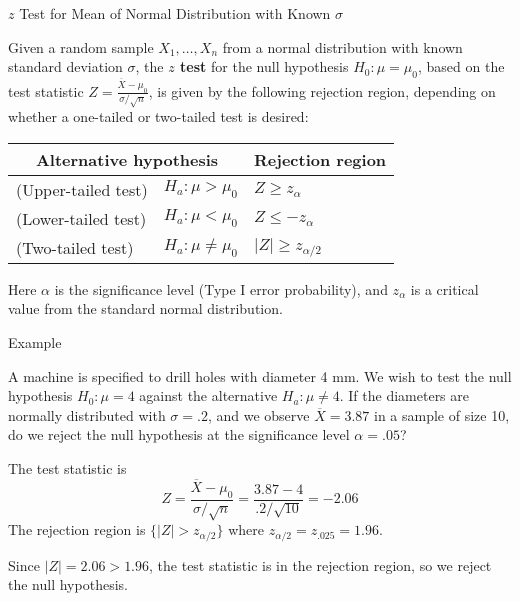 \documentclass{beamer}
\renewcommand{\emph}{\textbf}
\begin{document}
\begin{frame}{$z$ Test for Mean of Normal Distribution with Known $\sigma$}
\begin{block}{}
Given a random sample $X_1,\dots,X_n$ from a normal distribution with known standard deviation $\sigma$, the \emph{$z$ test} for the null hypothesis $H_0: \mu=\mu_0$, based on the test statistic $Z=\frac{\overline X-\mu_0}{\sigma/\sqrt{n}}$, is given by the following rejection region, depending on whether a one-tailed or two-tailed test is desired:
\begin{center}
\begin{tabular}{ll|l}
\multicolumn{2}{c}{Alternative hypothesis} & Rejection region \\ \hline
(Upper-tailed test) & $H_a: \mu>\mu_0$ & $Z\geq z_{\alpha}$ \\
(Lower-tailed test) & $H_a: \mu<\mu_0$ & $Z\leq -z_{\alpha}$ \\
(Two-tailed test) & $H_a: \mu\neq\mu_0$ & $|Z|\geq z_{\alpha/2}$\\
\end{tabular}
\end{center}
Here $\alpha$ is the significance level (Type I error probability), and $z_{\alpha}$ is a critical value from the standard normal distribution.
\end{block}
\end{frame}

\begin{frame}{Example}
\begin{block}{}
A machine is specified to drill holes with diameter 4 mm. We wish to test the null hypothesis $H_0: \mu=4$ against the alternative $H_a: \mu\neq 4$. If the diameters are normally distributed with $\sigma=.2$, and we observe $\overline X=3.87$ in a sample of size 10, do we reject the null hypothesis at the significance level $\alpha=.05$?
\end{block}

\pause
The test statistic is 
$$Z=\frac{\overline X-\mu_0}{\sigma/\sqrt{n}}=\frac{3.87-4}{.2/\sqrt{10}}=-2.06$$
\pause The rejection region is $\{|Z|>z_{\alpha/2}\}$ where $z_{\alpha/2}=z_{.025}=1.96$.

\vspace{.2cm}
\pause Since $|Z|=2.06>1.96$, the test statistic is in the rejection region, so we reject the null hypothesis.
\end{frame}
\end{document}
